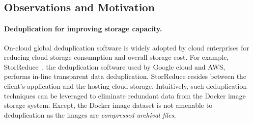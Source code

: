 \subsection{Observations and Motivation} %
\label{sec:observationandmotivation}



\paragraph{Deduplication for improving storage capacity.}

On-cloud global deduplication software is widely adopted by cloud enterprises for reducing cloud storage consumption and overall storage cost. 
For example, StorReduce~\cite{storReduce}, the deduplication software used by
Google cloud and AWS, 
performs in-line transparent data deduplication. StorReduce resides between the client's application and the hosting cloud storage.
Intuitively, such deduplication techniques can be leveraged to eliminate redundant data from the Docker image storage system.  
Except, the Docker image dataset is not amenable to deduplication 
as the images are \emph{compressed archival files}.


